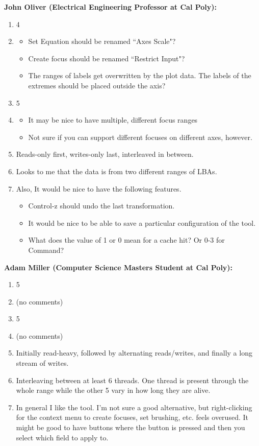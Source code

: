\documentclass[12pt]{ucthesis}
\begin{document}
\textbf{John Oliver (Electrical Engineering Professor at Cal Poly):}
\begin{enumerate}
\item 4
\item 
\begin{itemize}
\item Set Equation should be renamed ``Axes Scale"?
\item Create focus should be renamed ``Restrict Input"?
\item The ranges of labels get overwritten by the plot data.  The labels of the extremes should be placed outside the axis?
\end{itemize}
\item 5
\item 
\begin{itemize}
\item It may be nice to have multiple, different focus ranges
\item Not sure if you can support different focuses on different axes, however.
\end{itemize}
\item Reads-only first, writes-only last, interleaved in between.
\item Looks to me that the data is from two different ranges of LBAs.
\item Also, It would be nice to have the following features.
\begin{itemize}
\item Control-z should undo the last transformation.
\item It would be nice to be able to save a particular configuration of the tool.
\item What does the value of 1 or 0 mean for a cache hit?  Or 0-3 for Command?
\end{itemize}
\end{enumerate}

\textbf{Adam Miller (Computer Science Masters Student at Cal Poly):}
\begin{enumerate}
\item 5
\item (no comments)
\item 5
\item (no comments)
\item Initially read-heavy, followed by alternating reads/writes, and finally a long stream of writes.
\item Interleaving between at least 6 threads. One thread is present through the whole range while the other 5 vary in how long they are alive.
\item In general I like the tool. I'm not sure a good alternative, but right-clicking for the context menu to create focuses, set brushing, etc. feels overused. It might be good to have buttons where the button is pressed and then you select which field to apply to.
\end{enumerate}
\end{document}
